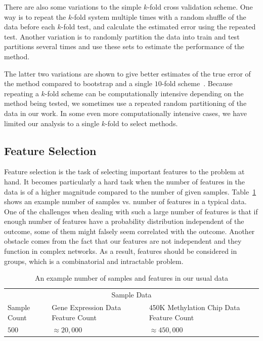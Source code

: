 There are also some variations to the simple $k$-fold cross validation scheme. One way is to repeat the $k$-fold system multiple times with a random shuffle of the data before each $k$-fold test, and calculate the estimated error using the repeated test. Another variation is to randomly partition the data into train and test partitions several times and use these sets to estimate the performance of the method.

The latter two variations are shown to give better estimates of the true error of the method compared to bootstrap and a single $10$-fold scheme~\cite{kim2009estimating, efron1994introduction}. Because repeating a $k$-fold scheme can be computationally intensive depending on the method being tested, we sometimes use a repeated random partitioning of the data in our work. In some even more computationally intensive cases, we have limited our analysis to a single $k$-fold to select methods.
  
\subsection{Feature Selection}
Feature selection is the task of selecting important features to the problem at hand. It becomes particularly a hard task when the number of features in the data is of a higher magnitude compared to the number of given samples. Table~\ref{tab:sample-sample-size} shows an example number of samples vs. number of features in a typical data. One of the challenges when dealing with such a large number of features is that if enough number of features have a probability distribution independent of the outcome, some of them might falsely seem correlated with the outcome. Another obstacle comes from the fact that our features are not independent and they function in complex networks. As a result, features should be considered in groups, which is a combinatorial and intractable problem.

\begin{table}[th!]
  \centering
  \begin{tabular}{p{3cm} p{3.5cm} p{4cm}}
    \hline
    \multicolumn{3}{c}{Sample Data} \\
    \cline{1-3}
    Sample Count   & Gene Expression Data Feature Count & 450K Methylation Chip Data Feature Count \\
    \hline
    $500$      & $\approx 20,000$    & $\approx 450,000$   \\
    \hline
  \end{tabular}
  \caption{An example number of samples and features in our usual data}
  \label{tab:sample-sample-size}
\end{table}

